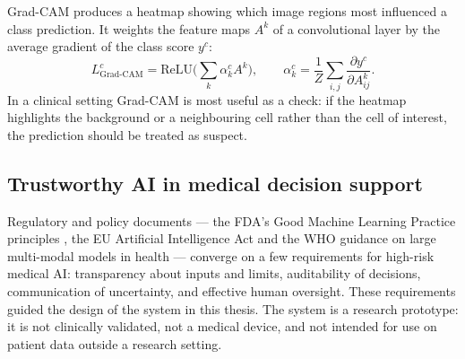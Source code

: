 Grad-CAM \cite{selvaraju2017} produces a heatmap showing which image regions most influenced a class prediction. It weights the feature maps $A^k$ of a convolutional layer by the average gradient of the class score $y^c$:
\begin{equation}
  L^c_{\text{Grad-CAM}} = \mathrm{ReLU}\Big(\sum_k \alpha_k^c A^k\Big), \qquad \alpha_k^c = \frac{1}{Z}\sum_{i,j}\frac{\partial y^c}{\partial A^k_{ij}}.
\end{equation}
In a clinical setting Grad-CAM is most useful as a check: if the heatmap highlights the background or a neighbouring cell rather than the cell of interest, the prediction should be treated as suspect.

\subsection{Trustworthy AI in medical decision support}

Regulatory and policy documents --- the FDA's Good Machine Learning Practice principles \cite{fda2021gmlp}, the EU Artificial Intelligence Act \cite{euaiact2024} and the WHO guidance on large multi-modal models in health \cite{who2024lmm} --- converge on a few requirements for high-risk medical AI: transparency about inputs and limits, auditability of decisions, communication of uncertainty, and effective human oversight. These requirements guided the design of the system in this thesis. The system is a research prototype: it is not clinically validated, not a medical device, and not intended for use on patient data outside a research setting.

\clearpage
